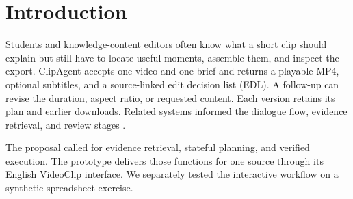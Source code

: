 \section{Introduction}
\label{sec:intro}
Students and knowledge-content editors often know what a short clip should explain but still have to locate useful moments, assemble them, and inspect the export. ClipAgent accepts one video and one brief and returns a playable MP4, optional subtitles, and a source-linked edit decision list (EDL). A follow-up can revise the duration, aspect ratio, or requested content. Each version retains its plan and earlier downloads. Related systems informed the dialogue flow, evidence retrieval, and review stages \citep{cliptalk,videoagent,videouse,openmontage}.

The proposal called for evidence retrieval, stateful planning, and verified execution. The prototype delivers those functions for one source through its English VideoClip interface. We separately tested the interactive workflow on a synthetic spreadsheet exercise. 

